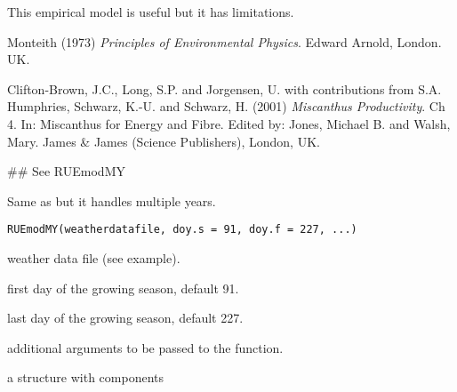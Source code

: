 \documentclass[letterpaper]{book}
\begin{document}
%
\begin{Note}\relax
This empirical model is useful but it has limitations.
\end{Note}
%
\begin{References}\relax
Monteith (1973) \emph{Principles of Environmental Physics}.
Edward Arnold, London. UK.

Clifton-Brown, J.C., Long, S.P. and Jorgensen, U. with
contributions from S.A. Humphries, Schwarz, K.-U. and
Schwarz, H. (2001) \emph{Miscanthus Productivity}. Ch 4.
In: Miscanthus for Energy and Fibre. Edited by: Jones,
Michael B. and Walsh, Mary. James \& James (Science
Publishers), London, UK.
\end{References}
%
\begin{SeeAlso}\relax
{}
\end{SeeAlso}
%
\begin{Examples}
\begin{ExampleCode}
## See RUEmodMY
\end{ExampleCode}
\end{Examples}
%
\begin{Description}\relax
Same as  but it handles multiple years.
\end{Description}
%
\begin{Usage}
\begin{verbatim}
RUEmodMY(weatherdatafile, doy.s = 91, doy.f = 227, ...)
\end{verbatim}
\end{Usage}
%
\begin{Arguments}
\begin{ldescription}
\item[\code{weatherdatafile}] weather data file (see example).

\item[\code{doy.s}] first day of the growing season, default
91.

\item[\code{doy.f}] last day of the growing season, default
227.

\item[\code{...}] additional arguments to be passed to the
 function.
\end{ldescription}
\end{Arguments}
%
\begin{Value}
a  structure with components
\end{Value}
\end{document}
